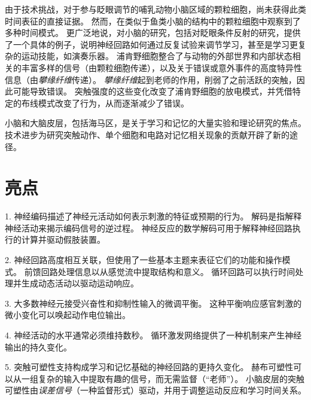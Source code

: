 由于技术挑战，对于参与眨眼调节的哺乳动物小脑区域的颗粒细胞，尚未获得此类时间表征的直接证据。
然而，在类似于鱼类小脑的结构中的颗粒细胞中观察到了多种时间模式。
更广泛地说，对小脑的研究，包括对眨眼条件反射的研究，提供了一个具体的例子，说明神经回路如何通过反复试验来调节学习，甚至是学习更复杂的运动技能，如演奏乐器。
浦肯野细胞整合了与动物的外部世界和内部状态相关的丰富多样的信号（由颗粒细胞传递），以及关于错误或意外事件的高度特异性信息（由\textit{攀缘纤维}传递）。
\textit{攀缘纤维}起到老师的作用，削弱了之前活跃的突触，因此可能导致错误。
突触强度的这些变化改变了浦肯野细胞的放电模式，并凭借特定的布线模式改变了行为，从而逐渐减少了错误。


小脑和大脑皮层，包括海马区，是关于学习和记忆的大量实验和理论研究的焦点。 
技术进步为研究突触动作、单个细胞和电路对记忆相关现象的贡献开辟了新的途径。



\section{亮点}

1. 神经编码描述了神经元活动如何表示刺激的特征或预期的行为。
解码是指解释神经活动来揭示编码信号的逆过程。
神经反应的数学解码可用于解释神经回路执行的计算并驱动假肢装置。 


2. 神经回路高度相互关联，但使用了一些基本主题来表征它们的功能和操作模式。 
前馈回路处理信息以从感觉流中提取结构和意义。 
循环回路可以执行时间处理并生成动态活动以驱动运动响应。


3. 大多数神经元接受兴奋性和抑制性输入的微调平衡。 
这种平衡响应感官刺激的微小变化可以唤起动作电位输出。


4. 神经活动的水平通常必须维持数秒。 
循环激发网络提供了一种机制来产生神经输出的持久变化。


5. 突触可塑性支持构成学习和记忆基础的神经回路的更持久变化。
赫布可塑性可以从一组复杂的输入中提取有趣的信号，而无需监督（“老师”）。
小脑皮层的突触可塑性由\textit{误差信号}（一种监督形式）驱动，并用于调整运动反应和学习时间关系。



